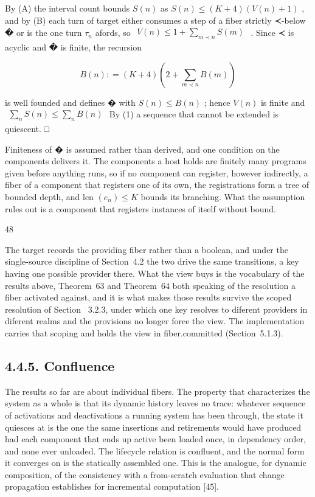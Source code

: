 \documentclass[
  10
]{article}
\newcounter{none} %
\begin{document}
By (A) the interval count bounds \(S ( n )\) as
\(S ( n ) \leq ( K + 4 ) ( V ( n ) + 1 )\) , and by (B) each turn of
target either consumes a step of a fiber strictly ≺-below � or is the
one turn \(\tau _ { n }\) afords, so
\(\begin{array} { r } { V ( n ) \leq 1 + \sum _ { m \prec n } S ( m ) } \end{array}\)
. Since ≺ is acyclic and � is finite, the recursion

\[
B ( n ) : = ( K + 4 ) \left( 2 + \sum _ { m \prec n } B ( m ) \right)
\]

is well founded and defines � with \(S ( n ) \leq B ( n )\) ; hence
\(V ( n )\) is finite and
\(\begin{array} { r } { \sum _ { n } S ( n ) \le \sum _ { n } B ( n ) } \end{array}\)
By (1) a sequence that cannot be extended is quiescent. □

Finiteness of � is assumed rather than derived, and one condition on the
components delivers it. The components a host holds are finitely many
programs given before anything runs, so if no component can register,
however indirectly, a fiber of a component that registers one of its
own, the registrations form a tree of bounded depth, and len
\(( e _ { n } ) \leq K\) bounds its branching. What the assumption rules
out is a component that registers instances of itself without bound.

48

The target records the providing fiber rather than a boolean, and under
the single-source discipline of Section~4.2 the two drive the same
transitions, a key having one possible provider there. What the view
buys is the vocabulary of the results above, Theorem~63 and Theorem~64
both speaking of the resolution a fiber activated against, and it is
what makes those results survive the scoped resolution of Section~
3.2.3, under which one key resolves to diferent providers in diferent
realms and the provisions no longer force the view. The implementation
carries that scoping and holds the view in fiber.committed
(Section~5.1.3).

\subsection{4.4.5. Confluence}\label{confluence}

The results so far are about individual fibers. The property that
characterizes the system as a whole is that its dynamic history leaves
no trace: whatever sequence of activations and deactivations a running
system has been through, the state it quiesces at is the one the same
insertions and retirements would have produced had each component that
ends up active been loaded once, in dependency order, and none ever
unloaded. The lifecycle relation is confluent, and the normal form it
converges on is the statically assembled one. This is the analogue, for
dynamic composition, of the consistency with a from-scratch evaluation
that change propagation establishes for incremental computation
{[}45{]}.
\end{document}
